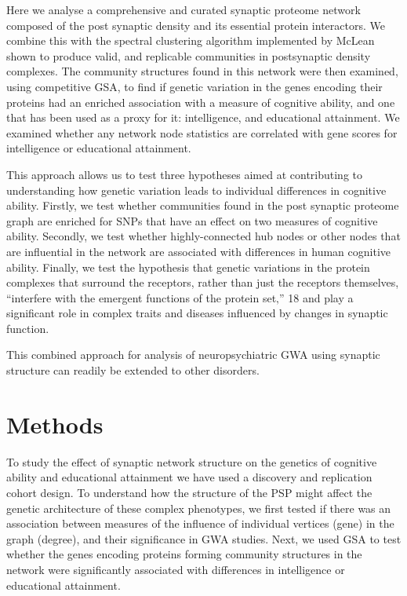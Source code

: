 Here we analyse a comprehensive and curated synaptic proteome network composed of the post synaptic density and its essential protein interactors. We combine this with the spectral clustering algorithm implemented by McLean shown to produce valid, and replicable communities in postsynaptic density complexes. \cite{mclean2016improved}  The community structures found in this network were then examined, using competitive GSA, to find if genetic variation in the genes encoding their proteins had an enriched association with a measure of cognitive ability, and one that has been used as a proxy for it: intelligence, and educational attainment. We examined whether any network node statistics are correlated with gene scores for intelligence or educational attainment.

This approach allows us to test three hypotheses aimed at contributing to understanding how genetic variation leads to individual differences in cognitive ability. Firstly, we test whether communities found in the post synaptic proteome graph are enriched for SNPs that have an effect on two measures of cognitive ability. Secondly, we test whether highly-connected hub nodes or other nodes that are influential in the network are associated with differences in human cognitive ability. Finally, we test the hypothesis that genetic variations in the protein complexes that surround the receptors, rather than just the receptors themselves, “interfere with the emergent functions of the protein set‚” 18  and play  a significant role in complex traits and diseases influenced by changes in synaptic function. 

This combined approach for analysis of neuropsychiatric GWA using synaptic structure can readily be extended to other disorders. 


\section{Methods}
To study the effect of synaptic network structure on the genetics of cognitive ability and educational attainment we have used a discovery and replication cohort design. To understand how the structure of the PSP might affect the genetic architecture of these complex phenotypes, we first tested if there was an association between measures of the influence of individual vertices (gene) in the graph (degree), and their significance in GWA studies. 
Next, we used GSA to test whether the genes encoding proteins forming community structures in the network were significantly associated with differences in intelligence or educational attainment. 

